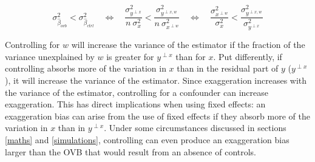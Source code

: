 			\[
				\sigma_{\hat{\beta}_{ovb}}^2 <  \sigma_{\hat{\beta}_{ctrl}}^2
                   		\quad \Leftrightarrow \quad 
				\dfrac{\sigma^{2}_{y^{\perp x}}}{n \ \sigma_{x}^{2}} < \dfrac{\sigma^{2}_{y^{\perp x, w}}}{n \ \sigma_{x^{\perp w}}^{2}}
				\quad \Leftrightarrow \quad 
				\dfrac{\sigma^{2}_{x^{\perp w}}}{\sigma_{x}^{2}} <
				\dfrac{\sigma^{2}_{y^{\perp x, w}}}{ \sigma_{y^{\perp x}}^{2}}
			\]
			
			Controlling for $w$ will increase the variance of the estimator if the fraction of the variance unexplained by $w$ is greater for $y^{\perp x}$ than for $x$. Put differently, if controlling absorbs more of the variation in $x$ than in the residual part of $y$ ($y^{\perp x}$), it will increase the variance of the estimator.  Since exaggeration increases with the variance of the estimator, controlling for a confounder can increase exaggeration.
			This has direct implications when using fixed effects: an exaggeration bias can arise from the use of fixed effects if they absorb more of the variation in $x$ than in $y^{\perp x}$. %
			 Under some circumstances discussed in sections \ref{maths} and \ref{simulations}, controlling can even produce an exaggeration bias larger than the OVB that would result from an absence of controls. 
			

